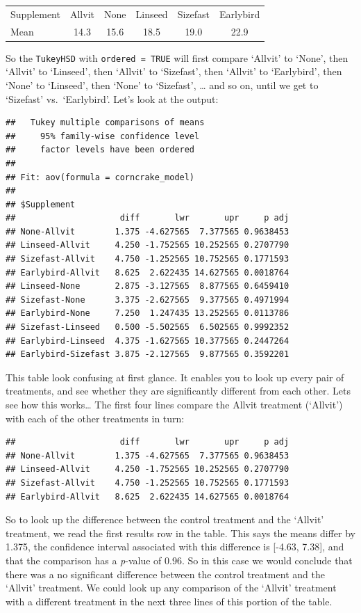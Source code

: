 \documentclass[
]{book}
\begin{document}
\begin{longtable}[]{@{}lccccc@{}}
\toprule
& & & & & \\
\midrule
\endhead
Supplement & Allvit & None & Linseed & Sizefast & Earlybird \\
Mean & 14.3 & 15.6 & 18.5 & 19.0 & 22.9 \\
\bottomrule
\end{longtable}

So the \texttt{TukeyHSD} with \texttt{ordered\ =\ TRUE} will first compare `Allvit' to `None', then `Allvit' to `Linseed', then `Allvit' to `Sizefast', then `Allvit' to `Earlybird', then `None' to `Linseed', then `None' to `Sizefast', \ldots{} and so on, until we get to `Sizefast' vs.~`Earlybird'. Let's look at the output:

\begin{verbatim}
##   Tukey multiple comparisons of means
##     95% family-wise confidence level
##     factor levels have been ordered
## 
## Fit: aov(formula = corncrake_model)
## 
## $Supplement
##                     diff       lwr       upr     p adj
## None-Allvit        1.375 -4.627565  7.377565 0.9638453
## Linseed-Allvit     4.250 -1.752565 10.252565 0.2707790
## Sizefast-Allvit    4.750 -1.252565 10.752565 0.1771593
## Earlybird-Allvit   8.625  2.622435 14.627565 0.0018764
## Linseed-None       2.875 -3.127565  8.877565 0.6459410
## Sizefast-None      3.375 -2.627565  9.377565 0.4971994
## Earlybird-None     7.250  1.247435 13.252565 0.0113786
## Sizefast-Linseed   0.500 -5.502565  6.502565 0.9992352
## Earlybird-Linseed  4.375 -1.627565 10.377565 0.2447264
## Earlybird-Sizefast 3.875 -2.127565  9.877565 0.3592201
\end{verbatim}

This table look confusing at first glance. It enables you to look up every pair of treatments, and see whether they are significantly different from each other. Lets see how this works\ldots{} The first four lines compare the Allvit treatment (`Allvit') with each of the other treatments in turn:

\begin{verbatim}
##                     diff       lwr       upr     p adj 
## None-Allvit        1.375 -4.627565  7.377565 0.9638453 
## Linseed-Allvit     4.250 -1.752565 10.252565 0.2707790 
## Sizefast-Allvit    4.750 -1.252565 10.752565 0.1771593 
## Earlybird-Allvit   8.625  2.622435 14.627565 0.0018764
\end{verbatim}

So to look up the difference between the control treatment and the `Allvit' treatment, we read the first results row in the table. This says the means differ by 1.375, the confidence interval associated with this difference is {[}-4.63, 7.38{]}, and that the comparison has a \emph{p}-value of 0.96. So in this case we would conclude that there was a no significant difference between the control treatment and the `Allvit' treatment. We could look up any comparison of the `Allvit' treatment with a different treatment in the next three lines of this portion of the table.
\end{document}
